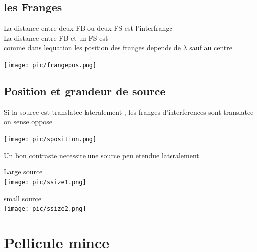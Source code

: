 \documentclass[12pt]{book}
\begin{document}
            \subsection{les Franges}
                \begin{minipage}{0.8\linewidth}
                    La distance entre deux FB ou deux FS est l'interfrange  \\
                    La distance entre FB et un FS est  \\
                    comme dans lequation les position des franges depende de $\lambda $ sauf au centre 
                \end{minipage}
                \begin{minipage}{0.2\linewidth}
                    \texttt{[image: pic/frangepos.png]}
                \end{minipage}
            \subsection{Position et grandeur de source}
                \begin{minipage}{0.6\linewidth}
                   Si la source est translatee lateralement , les franges d'interferences sont translatee on sense oppose
                \end{minipage}
                \begin{minipage}{0.4\linewidth}
                    \texttt{[image: pic/sposition.png]}
                \end{minipage} 
                
                Un bon contraste necessite une source peu etendue lateralement \\
                    \begin{minipage}{0.45\linewidth}
                        Large source\\
                        \texttt{[image: pic/ssize1.png]}
                    \end{minipage}
                    \begin{minipage}{0.54\linewidth}
                        small source\\
                        \texttt{[image: pic/ssize2.png]}
                    \end{minipage}
           
        \section{Pellicule mince}
            
\end{document}
